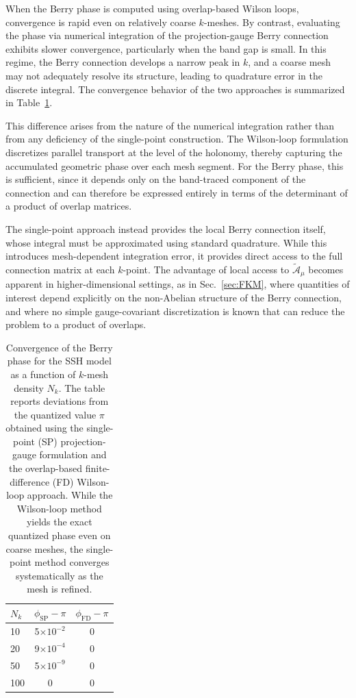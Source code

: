 \documentclass[galley,aps,pra,10pt,amsmath,amssymb,
    superscriptaddress,nofootinbib,longbibliography]{revtex4-2}
\newcounter{comm}
\begin{document}
When the Berry phase is computed using overlap-based Wilson loops, convergence is rapid even on relatively coarse $k$-meshes. By contrast, evaluating the phase via numerical integration of the projection-gauge Berry connection exhibits slower convergence, particularly when the band gap is small. In this regime, the Berry connection develops a narrow peak in $k$, and a coarse mesh may not adequately resolve its structure, leading to quadrature error in the discrete integral. The convergence behavior of the two approaches is summarized in Table~\ref{tab:phases}.

This difference arises from the nature of the numerical integration rather than from any deficiency of the single-point construction. The Wilson-loop formulation discretizes parallel transport at the level of the holonomy, thereby capturing the accumulated geometric phase over each mesh segment. For the Berry phase, this is sufficient, since it depends only on the band-traced component of the connection and can therefore be expressed entirely in terms of the determinant of a product of overlap matrices.

The single-point approach instead provides the local Berry connection itself, whose integral must be approximated using standard quadrature. While this introduces mesh-dependent integration error, it provides direct access to the full connection matrix at each $k$-point. The advantage of local access to $\tilde{\mathcal{A}}_\mu$ becomes apparent in higher-dimensional settings, as in Sec.~\ref{sec:FKM}, where quantities of interest depend explicitly on the non-Abelian structure of the Berry connection, and where no simple gauge-covariant discretization is known that can reduce the problem to a product of overlaps. 


\newcommand\Tstrut{\rule{0pt}{2.9ex}}  %
\newcommand\Bstrut{\rule[-1.2ex]{0pt}{0pt}} %
\begin{table}[t!]
    \centering
    \begin{ruledtabular}
    \begin{tabular}{lcc}
    $N_k$& $\phi_{\mathrm{SP}}-\pi$ & $\phi_{\mathrm{FD}}-\pi$\\
     \hline \Tstrut
     10  & 5$\times 10^{-2}$ & 0 \\
     20  & 9$\times 10^{-4}$ & 0 \\
     50  & 5$\times 10^{-9}$ & 0 \\
     100 & 0 & 0 
    \end{tabular}
    \end{ruledtabular}
    \caption{Convergence of the Berry phase for the SSH model as a function of $k$-mesh density $N_k$. The table reports deviations from the quantized value $\pi$ obtained using the single-point (SP) projection-gauge formulation and the overlap-based finite-difference (FD) Wilson-loop approach. While the Wilson-loop method yields the exact quantized phase even on coarse meshes, the single-point method converges systematically as the mesh is refined.} 
    \label{tab:phases}
\end{table}
\end{document}
